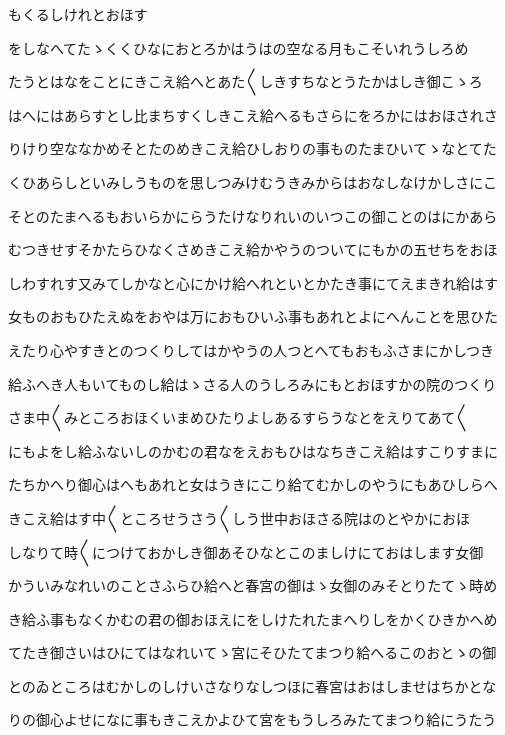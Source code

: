 \documentclass[a4paper,11pt,landscape]{ltjtarticle}
\begin{document}
もくるしけれとおほす
\par\medskip
をしなへてたゝくくひなにおとろかはうはの空なる月もこそいれうしろめ
\par\medskip
たうとはなをことにきこえ給へとあた〱しきすちなとうたかはしき御こゝろ
\par\medskip
はへにはあらすとし比まちすくしきこえ給へるもさらにをろかにはおほされさ
\par\medskip
りけり空ななかめそとたのめきこえ給ひしおりの事ものたまひいてゝなとてた
\par\medskip
くひあらしといみしうものを思しつみけむうきみからはおなしなけかしさにこ
\par\medskip
そとのたまへるもおいらかにらうたけなりれいのいつこの御ことのはにかあら
\par\medskip
むつきせすそかたらひなくさめきこえ給かやうのついてにもかの五せちをおほ
\par\medskip
しわすれす又みてしかなと心にかけ給へれといとかたき事にてえまきれ給はす
\par\medskip
女ものおもひたえぬをおやは万におもひいふ事もあれとよにへんことを思ひた
\par\medskip
えたり心やすきとのつくりしてはかやうの人つとへてもおもふさまにかしつき
\par\medskip
給ふへき人もいてものし給はゝさる人のうしろみにもとおほすかの院のつくり
\par\medskip
さま中〱みところおほくいまめひたりよしあるすらうなとをえりてあて〱
\par\medskip
にもよをし給ふないしのかむの君なをえおもひはなちきこえ給はすこりすまに
\par\medskip
たちかへり御心はへもあれと女はうきにこり給てむかしのやうにもあひしらへ
\par\medskip
きこえ給はす中〱ところせうさう〱しう世中おほさる院はのとやかにおほ
\par\medskip
しなりて時〱につけておかしき御あそひなとこのましけにておはします女御
\par\medskip
かういみなれいのことさふらひ給へと春宮の御はゝ女御のみそとりたてゝ時め
\par\medskip
き給ふ事もなくかむの君の御おほえにをしけたれたまへりしをかくひきかへめ
\par\medskip
てたき御さいはひにてはなれいてゝ宮にそひたてまつり給へるこのおとゝの御
\par\medskip
とのゐところはむかしのしけいさなりなしつほに春宮はおはしませはちかとな
\par\medskip
りの御心よせになに事もきこえかよひて宮をもうしろみたてまつり給にうたう
\end{document}
